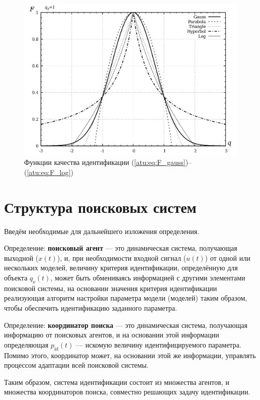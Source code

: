 \begin{figure}[htb!]
  \centerline{\includegraphics[width=45\TW]{p/F_types.png} }
  \caption{Функции качества идентификации (\ref{atu:eq:F_gauss})--(\ref{atu:eq:F_log})}
  \label{atu:f:F_types}
\end{figure}




\section{Структура поисковых систем}  %


Введём необходимые для дальнейшего изложения определения.

Определение: \textbf{поисковый агент} --- это динамическая система, получающая выходной ($x(t)$),
и, при необходимости входной сигнал ($u(t)$) от одной или нескольких моделей,
величину критерия идентификации, определённую для объекта $q_o(t)$,
может быть обмениваясь информацией с другими элементами поисковой системы,
на основании значения критерия идентификации
реализующая алгоритм настройки параметра модели (моделей)
таким образом, чтобы обеспечить идентификацию заданного параметра.


Определение: \textbf{координатор поиска} --- это динамическая система, получающая информацию
от поисковых агентов, и на основании этой информации определяющая
$p_\mathrm{id}(t)$ --- искомую величину идентифицируемого параметра.
Помимо этого, координатор может, на основании этой же информации,
управлять процессом адаптации всей поисковой системы.

Таким образом, система идентификации состоит
из множества агентов, и множества координаторов поиска,
совместно решающих задачу идентификации.

